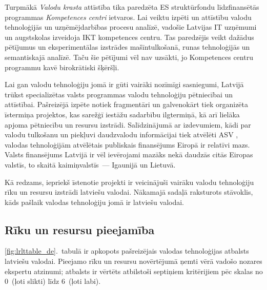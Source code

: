 \begin{multicols}{2}
Turpmākā \textit{Valodu krasta} attīstība tika paredzēta ES struktūrfondu līdzfinansētās programmas \textit{Kompetences centri} ietvaros.
Lai veiktu izpēti un attīstību valodu tehnoloģijās un uzņēmējdarbības procesu analīzē, vadošie Latvijas IT uzņēmumi un augstskolas izveidoja IKT kompetences centru.
Tas paredzējis veikt dažādus pētījumus un eksperimentālas izstrādes mašīntulkošanā, runas tehnoloģijās un semantiskajā analīzē.
Taču šie pētījumi vēl nav uzsākti, jo Kompetences centru programmu kavē birokrātiski šķēršļi.

Lai gan valodu tehnoloģiju jomā ir gūti vairāki nozīmīgi sasniegumi, Latvijā trūkst specializētas valsts programmas valodu tehnoloģiju pētniecībai un attīstībai.
Pašreizējā izpēte notiek fragmentāri un galvenokārt tiek organizēta īstermiņa projektos, kas sarežģī iestāžu sadarbību ilgtermiņā, kā arī lielāka apjoma pētniecību un resursu izstrādi.
Salīdzinājumā ar izdevumiem, kādi par valodu tulkošanu un piekļuvi daudzvalodu informācijai tiek atvēlēti ASV \cite{Meta46}, valodas tehnoloģijām atvēlētais publiskais finansējums Eiropā ir relatīvi mazs.
Valsts finansējums Latvijā ir vēl ievērojami mazāks nekā daudzās citās Eiropas valstīs, to skaitā kaimiņvalstīs~--- Igaunijā un Lietuvā.

Kā redzams, iepriekš īstenotie projekti ir veicinājuši vairāku valodu tehnoloģiju rīku un resursu izstrādi latviešu valodai.
Nākamajā sadaļā raksturots stāvoklis, kāds pašlaik valodas tehnoloģiju jomā ir latviešu valodai.

\subsection{Rīku un resursu pieejamība}

\ref{fig:lrlttable_de}.~tabulā ir apkopots pašreizējais valodas tehnoloģijas atbalsts latviešu valodai.
Pieejamo rīku un resursu novērtējumā ņemti vērā vadošo nozares ekspertu atzinumi; atbalsts ir vērtēts atbilstoši septiņiem kritērijiem pēc skalas no 0~(ļoti slikti) līdz 6~(ļoti labi). 


\end{multicols}
